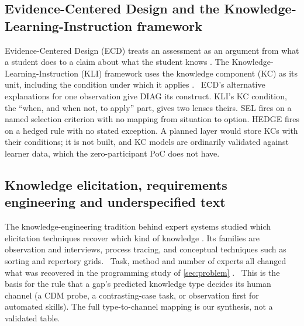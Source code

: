 \subsection{Evidence-Centered Design and the Knowledge-Learning-Instruction
  framework}

Evidence-Centered Design (ECD) treats an assessment as an argument from what
a student does to a claim about what the student knows
\parencite{mislevy2003structure}. The Knowledge-Learning-Instruction (KLI)
framework uses the knowledge component (KC) as its unit, including the
condition under which it applies \parencite{koedinger2012knowledge}. \evint\ ECD's alternative explanations
for one observation give DIAG its construct. KLI's KC condition, the ``when,
and when not, to apply'' part, gives two lenses theirs. SEL fires on a named
selection criterion with no mapping from situation to option. HEDGE fires on a
hedged rule with no stated exception. A planned layer would store KCs with
their conditions; it is not built, and KC models are ordinarily validated
against learner data, which the zero-participant PoC does not have.

\subsection{Knowledge elicitation, requirements engineering and underspecified text}

The knowledge-engineering tradition behind expert systems studied which
elicitation techniques recover which kind of knowledge
\parencite{cooke1994varieties,hoffman1995eliciting}. Its families are
observation and interviews, process tracing, and conceptual techniques such as
sorting and repertory grids.
\evlit\ Task, method and number of experts all changed what was recovered in
the programming study of \cref{sec:problem} \parencite{chao1994percentage}.
\evint\ This is the basis for the rule that a gap's predicted knowledge type
decides its human channel (a CDM probe, a contrasting-case task, or
observation first for automated skills). The full type-to-channel mapping is
our synthesis, not a validated table.

